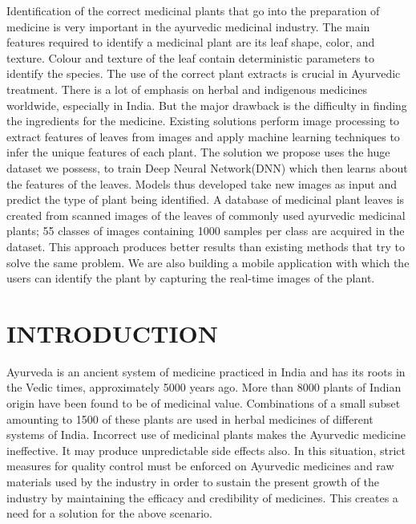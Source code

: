 Identification of the correct medicinal plants that go into the preparation of medicine is very important in the ayurvedic medicinal industry. The main features required to identify a medicinal plant are its leaf shape, color, and texture. Colour and texture of the leaf contain deterministic parameters to identify the species. The use of the correct plant extracts is crucial in Ayurvedic treatment. There is a lot of emphasis on herbal and indigenous
medicines worldwide, especially in India. But the major drawback is the difficulty in finding the ingredients for the medicine. Existing solutions perform image processing to extract features of leaves from images and apply machine learning techniques to infer the unique features of each plant.  The solution we propose uses the huge dataset we possess, to train Deep Neural Network(DNN) which then learns about the features of the leaves. Models thus developed take new images as input and predict the type of plant being identified. A database of medicinal plant leaves is created from scanned images of the leaves of commonly used ayurvedic medicinal plants; 55 classes of images containing 1000 samples per class are acquired in the dataset. This approach produces better results than existing methods that try to solve the same problem. We are also building a mobile application with which the users can identify the plant by capturing the real-time images of the plant.

%       
%
\tableofcontents
{}
\listoffigures
{}
\listoftables

\mainmatter



\chapter {INTRODUCTION}
Ayurveda is an ancient system of medicine practiced in India and has its roots in the Vedic times, approximately 5000 years ago. More than 8000 plants of Indian origin have been found to be of medicinal value. Combinations of a small subset amounting to 1500 of these plants are used in herbal medicines of different systems of India. Incorrect use of medicinal plants makes the Ayurvedic medicine ineffective. It may produce unpredictable side effects also. In this situation, strict measures for quality control must
be enforced on Ayurvedic medicines and raw materials used by the industry in order to sustain the present growth of the industry by maintaining the efficacy and credibility of medicines. This creates a need for a solution for the above scenario.

